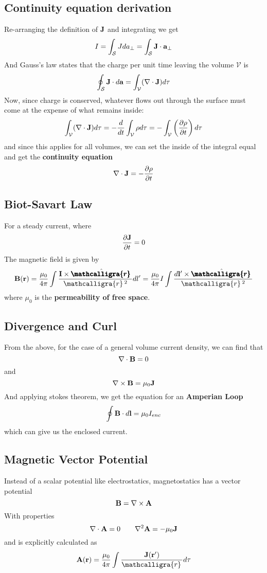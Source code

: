 \documentclass{article}
\newcommand{\scriptr}{\mathcalligra{r}\,}
\newcommand{\boldscriptr}{\pmb{\mathcalligra{r}}\,}
\newcommand{\vh}[1]{\hat{\vb{#1}}}
\begin{document}
\subsection{Continuity equation derivation}

Re-arranging the definition of $\vb{J}$ and integrating we get
$$
I = \int_\mathcal{S} J da_\perp = \int_\mathcal{S} \vb{J} \cdot \vb{a}_\perp
$$
And Gauss's law states that the charge per unit time leaving the volume $\mathcal{V}$ is
$$
\oint_\mathcal{S} \vb{J} \cdot d\vb{a} = \int_\mathcal{V} (\nabla \cdot \vb{J}) d\tau
$$
Now, since charge is conserved, whatever flows out through the surface must come at the expense of what remains inside:
$$
\int_\mathcal{V} (\nabla \cdot \vb{J}) d\tau = -\frac{d}{dt} \int_\mathcal{V} \rho d\tau = - \int_\mathcal{V} \left( \frac{\partial \rho}{\partial t} \right) d\tau
$$
and since this applies for all volumes, we can set the inside of the integral equal and get the \textbf{continuity equation}
$$
\nabla \cdot \vb{J} = - \frac{\partial \rho}{\partial t}
$$

\subsection{Biot-Savart Law}
For a steady current, where
$$
\frac{\partial \vb{J}}{\partial t} = 0
$$
The magnetic field is given by
$$
\vb{B}(\vb{r}) = \frac{\mu_0}{4\pi} \int \frac{\vb{I} \times \vh{\boldscriptr}}{\scriptr^2} dl' = \frac{\mu_0}{4\pi} I \int \frac{d\vb{l'}\times \vh{\boldscriptr}}{\scriptr^2}
$$
where $\mu_0$ is the \textbf{permeability of free space}.

\subsection{Divergence and Curl}
From the above, for the case of a general volume current density, we can find that
$$
\nabla \cdot \vb{B} = 0
$$
and 
$$
\nabla \times \vb{B} = \mu_0 \vb{J}
$$
And applying stokes theorem, we get the equation for an \textbf{Amperian Loop}
$$
\oint \vb{B} \cdot d\vb{l} = \mu_0 I_{enc}
$$
which can give us the enclosed current.
\subsection{Magnetic Vector Potential}
Instead of a scalar potential like electrostatics, magnetostatics has a vector potential
$$
\vb{B} = \nabla \times \vb{A}
$$
With properties
$$
\nabla \cdot \vb{A} = 0 \qquad \nabla^2 \vb{A} = -\mu_0 \vb{J}
$$
and is explicitly calculated as 
$$
\vb{A}(\vb{r}) = \frac{\mu_0}{4\pi} \int \frac{\vb{J}(\vb{r'})}{\scriptr} d\tau
$$
\end{document}
